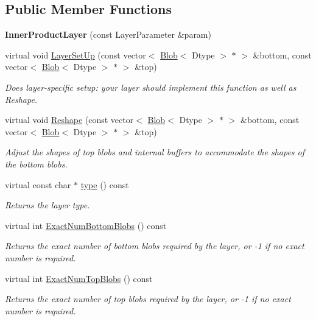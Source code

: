 \subsection*{Public Member Functions}
\begin{DoxyCompactItemize}
\item 
{\bfseries Inner\+Product\+Layer} (const Layer\+Parameter \&param)\hypertarget{classcaffe_1_1InnerProductLayer_a997e3c54ed0414ebcd8eec13f083af07}{}\label{classcaffe_1_1InnerProductLayer_a997e3c54ed0414ebcd8eec13f083af07}

\item 
virtual void \hyperlink{classcaffe_1_1InnerProductLayer_af9ab23bd130b6b57ae3f04e0ad714128}{Layer\+Set\+Up} (const vector$<$ \hyperlink{classcaffe_1_1Blob}{Blob}$<$ Dtype $>$ $\ast$ $>$ \&bottom, const vector$<$ \hyperlink{classcaffe_1_1Blob}{Blob}$<$ Dtype $>$ $\ast$ $>$ \&top)
\begin{DoxyCompactList}\small\item\em Does layer-\/specific setup\+: your layer should implement this function as well as Reshape. \end{DoxyCompactList}\item 
virtual void \hyperlink{classcaffe_1_1InnerProductLayer_a876806186184424573075b04281e9a72}{Reshape} (const vector$<$ \hyperlink{classcaffe_1_1Blob}{Blob}$<$ Dtype $>$ $\ast$ $>$ \&bottom, const vector$<$ \hyperlink{classcaffe_1_1Blob}{Blob}$<$ Dtype $>$ $\ast$ $>$ \&top)
\begin{DoxyCompactList}\small\item\em Adjust the shapes of top blobs and internal buffers to accommodate the shapes of the bottom blobs. \end{DoxyCompactList}\item 
virtual const char $\ast$ \hyperlink{classcaffe_1_1InnerProductLayer_a4f3a80850aa7ad5efec4fab43695a919}{type} () const \hypertarget{classcaffe_1_1InnerProductLayer_a4f3a80850aa7ad5efec4fab43695a919}{}\label{classcaffe_1_1InnerProductLayer_a4f3a80850aa7ad5efec4fab43695a919}

\begin{DoxyCompactList}\small\item\em Returns the layer type. \end{DoxyCompactList}\item 
virtual int \hyperlink{classcaffe_1_1InnerProductLayer_a53daee4cea7f8902042418a3925ee0a5}{Exact\+Num\+Bottom\+Blobs} () const 
\begin{DoxyCompactList}\small\item\em Returns the exact number of bottom blobs required by the layer, or -\/1 if no exact number is required. \end{DoxyCompactList}\item 
virtual int \hyperlink{classcaffe_1_1InnerProductLayer_a14a316bbfecc839fc65dc9c8aadc0b6d}{Exact\+Num\+Top\+Blobs} () const 
\begin{DoxyCompactList}\small\item\em Returns the exact number of top blobs required by the layer, or -\/1 if no exact number is required. \end{DoxyCompactList}\end{DoxyCompactItemize}
